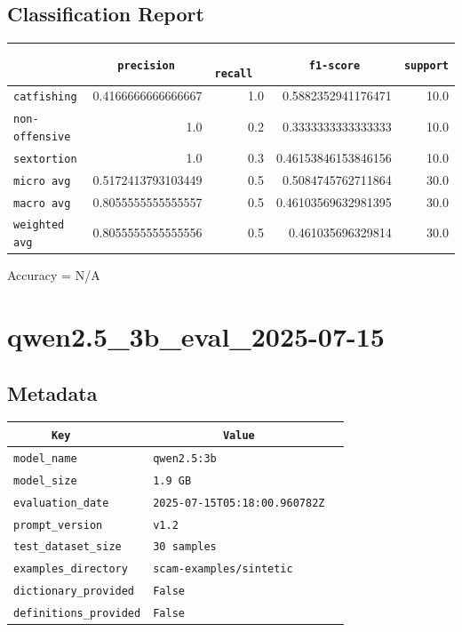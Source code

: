 \documentclass{article}
\begin{document}
\subsection{Classification Report}

\begin{center}
\begin{tabular}{l | r | r | r | r} \hline
    \verb|            | & \verb|    precision     | & \verb|      recall      | & \verb|     f1-score     | & \verb|support| \\ \hline
    \hline
    \verb|catfishing | & 0.4166666666666667 & 1.0 & 0.5882352941176471 &    10.0 \\ \hline
    \verb|non-offensive| & 1.0 & 0.2 & 0.3333333333333333 &    10.0 \\ \hline
    \verb|sextortion | & 1.0 & 0.3 & 0.46153846153846156 &    10.0 \\ \hline
    \verb|micro avg  | & 0.5172413793103449 & 0.5 & 0.5084745762711864 &    30.0 \\ \hline
    \verb|macro avg  | & 0.8055555555555557 & 0.5 & 0.46103569632981395 &    30.0 \\ \hline
    \verb|weighted avg| & 0.8055555555555556 & 0.5 & 0.461035696329814 &    30.0 \\ \hline
\end{tabular}
\end{center}

\begin{center}
Accuracy = N/A
\end{center}

\section{qwen2.5\_3b\_eval\_2025-07-15}
\subsection{Metadata}

\begin{center}
\begin{tabular}{l | l} \hline
    \verb|      Key      | & \verb|           Value           | \\ \hline
    \hline
    \verb|model_name    | & \verb|qwen2.5:3b                   | \\ \hline
    \verb|model_size    | & \verb|1.9 GB                       | \\ \hline
    \verb|evaluation_date| & \verb|2025-07-15T05:18:00.960782Z  | \\ \hline
    \verb|prompt_version| & \verb|v1.2                         | \\ \hline
    \verb|test_dataset_size| & \verb|30 samples                   | \\ \hline
    \verb|examples_directory| & \verb|scam-examples/sintetic       | \\ \hline
    \verb|dictionary_provided| & \verb|False                        | \\ \hline
    \verb|definitions_provided| & \verb|False                        | \\ \hline
\end{tabular}
\end{center}
\end{document}

